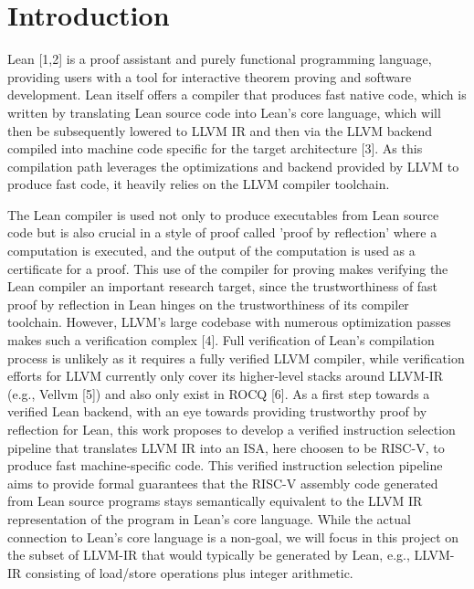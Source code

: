\newcommand{\package}{\emph}

\chapter{Introduction}
Lean [1,2] is a proof assistant and purely functional programming language, providing users with a tool for interactive theorem proving and software development. Lean itself offers a compiler that produces fast native code, which is written by translating Lean source code into Lean's core language, which will then be subsequently lowered to LLVM IR and then via the LLVM backend compiled into machine code specific for the target architecture [3]. As this compilation path leverages the optimizations and backend provided by LLVM to produce fast code, it heavily relies on the LLVM compiler toolchain. 

The Lean compiler is used not only to produce executables from Lean source code but is also crucial in a style of proof called 'proof by reflection' where a computation is executed, and the output of the computation is used as a certificate for a proof. This use of the compiler for proving makes verifying the Lean compiler an important research target, since the trustworthiness of fast proof by reflection in Lean hinges on the trustworthiness of its compiler toolchain. However, LLVM's large codebase with numerous optimization passes makes such a verification complex [4]. Full verification of Lean's compilation process is unlikely as it requires a fully verified LLVM compiler, while verification efforts for LLVM currently only cover its higher-level stacks around LLVM-IR (e.g., Vellvm [5]) and also only exist in ROCQ [6]. As a first step towards a verified Lean backend, with an eye towards providing trustworthy proof by reflection for Lean, this work proposes to develop a verified instruction selection pipeline that translates LLVM IR into an ISA, here choosen to be RISC-V, to produce fast machine-specific code. This verified instruction selection pipeline aims to provide formal guarantees that the RISC-V assembly code generated from Lean source programs stays semantically equivalent to the LLVM IR representation of the program in Lean’s core language. While the actual connection to Lean’s core language is a non-goal, we will focus in this project on the subset of LLVM-IR that would typically be generated by Lean, e.g., LLVM-IR consisting of load/store operations plus integer arithmetic.

